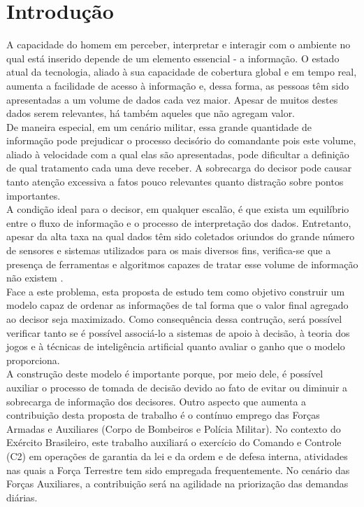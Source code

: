 \documentclass[a4paper,12pt]{article}
\begin{document}
\section{Introdução}
A capacidade do homem em perceber, interpretar e interagir com o ambiente no qual está inserido depende de um elemento essencial - a informação.
O estado atual da tecnologia, aliado à sua capacidade de cobertura global e em tempo real, aumenta a facilidade de acesso à informação e, dessa forma, as pessoas 
têm sido apresentadas a um volume de dados cada vez maior. Apesar de muitos destes dados serem relevantes, há também aqueles que não agregam valor.\\
\indent De maneira especial, em um cenário militar, essa grande quantidade de informação pode prejudicar o processo decisório do 
comandante pois este volume, aliado à velocidade com a qual elas são apresentadas, pode dificultar a definição de qual tratamento cada uma deve receber.
A sobrecarga do decisor pode causar tanto atenção excessiva a fatos pouco relevantes quanto distração sobre pontos importantes.\\
\indent A condição ideal para o decisor, em qualquer escalão, é que exista um equilíbrio entre o fluxo de informação e o processo de interpretação dos dados.
Entretanto, apesar da alta taxa na qual dados têm sido coletados oriundos do grande número de sensores e sistemas utilizados para os mais diversos fins, 
verifica-se que a presença de ferramentas e algoritmos capazes de tratar esse volume de informação não existem \cite{Savas 2014}.\\
\indent Face a este problema, esta proposta de estudo tem como objetivo construir um modelo capaz de ordenar as informações 
de tal forma que o valor final agregado ao decisor seja maximizado. Como consequência dessa contrução, será possível verificar 
tanto se é possível associá-lo a sistemas de apoio à decisão, à teoria dos jogos e à técnicas de inteligência artificial quanto 
avaliar o ganho que o modelo proporciona.\\
\indent A construção deste modelo é importante porque, por meio dele, é possível auxiliar o processo de tomada de decisão devido ao fato de evitar ou diminuir 
a sobrecarga de informação dos decisores. Outro aspecto que aumenta a contribuição desta proposta de trabalho é o contínuo emprego das Forças Armadas e 
Auxiliares (Corpo de Bombeiros e Polícia Militar). No contexto do Exército Brasileiro, este trabalho auxiliará o exercício do Comando e Controle (C2) em operações 
de garantia da lei e da ordem e de defesa interna, atividades nas quais a Força Terrestre tem sido empregada frequentemente. No cenário das Forças Auxiliares,
a contribuição será na agilidade na priorização das demandas diárias.
\end{document}
